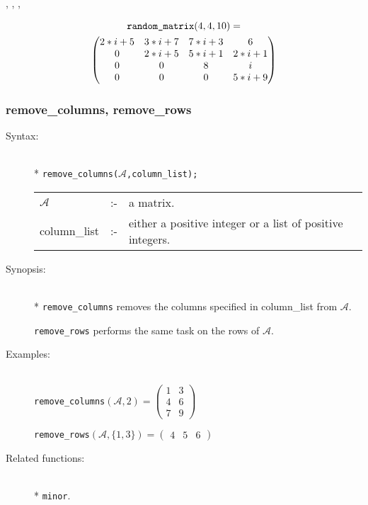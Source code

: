 \begin{description}
  , , , 

  \begin{multline*}
  \text{\texttt{random\_matrix}}(4,4,10) = \\
  \begin{pmatrix} 2*i+5 & 3*i+7 & 7*i+3 & 6 \\ 0 & 2*i+5 &
    5*i+1 & 2*i+1 \\ 0 & 0 & 8 & i \\ 0 & 0 & 0& 5*i+9
  \end{pmatrix}
\end{multline*}
\end{description}


\subsubsection{remove\_columns, remove\_rows}
\label{linalg:remove_columns}
\hypertarget{operator:REMOVE_COLUMNS}{}

\begin{description}
\item[Syntax:]\mbox{}\\*
\texttt{remove\_columns($\mathcal{A}$,column\_list);}\\[2mm]
\begin{tabular}{l l l}
$\mathcal{A}$   &:-& a matrix. \\
column\_list &:-& either a positive integer or a list of
                  positive integers.
\end{tabular}

\item[Synopsis:]\mbox{}\\*
\texttt{remove\_columns} removes the columns specified in
                column\_list from $\mathcal{A}$.

\texttt{remove\_rows} performs the same task on the rows
                of $\mathcal{A}$.

\item[Examples:]\mbox{}\\
\texttt{remove\_columns}\((\mathcal{A},2) =
        \begin{pmatrix} 1 & 3 \\ 4 & 6 \\ 7 & 9  \end{pmatrix}\)

\texttt{remove\_rows}\((\mathcal{A},\{1,3\}) =
        \begin{pmatrix} 4 & 5 & 6 \end{pmatrix}\)

\item[Related functions:]\mbox{}\\*
\texttt{minor}.
\end{description}


